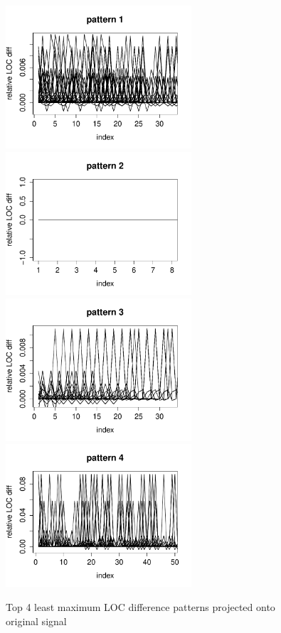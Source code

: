 \begin{figure}[H]
\caption{Top 4 least maximum LOC difference patterns projected onto original
signal}\label{figure:top_patterns_plots}
\centering
	\includegraphics[width=196pt]{images/pattern_1.pdf}
	\hspace{1em}
	\includegraphics[width=196pt]{images/pattern_2.pdf}
	\\
	\vspace{1em}
	\includegraphics[width=196pt]{images/pattern_3.pdf}
	\hspace{1em}
	\includegraphics[width=196pt]{images/pattern_4.pdf}
\end{figure}